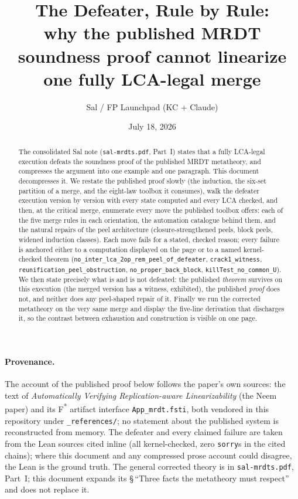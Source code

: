 \documentclass[11pt]{article}
\title{\bfseries The Defeater, Rule by Rule:\\
\large why the published MRDT soundness proof cannot linearize one
fully LCA-legal merge}
\author{Sal / FP Launchpad (KC + Claude)}
\date{July 18, 2026}
\newcommand{\lean}[1]{\texttt{#1}}
\begin{document}
\maketitle
\sloppy

\begin{abstract}
\noindent
The consolidated Sal note (\texttt{sal-mrdts.pdf}, Part~I) states that a
fully LCA-legal execution defeats the soundness proof of the published
MRDT metatheory, and compresses the argument into one example and one
paragraph. This document decompresses it. We restate the published
proof slowly (the induction, the six-set partition of a merge, and the
eight-law toolbox it consumes), walk the defeater execution version by
version with every state computed and every LCA checked, and then, at
the critical merge, enumerate every move the published toolbox offers:
each of the five merge rules in each orientation, the automation
catalogue behind them, and the natural repairs of the peel architecture
(closure-strengthened peels, block peels, widened induction classes).
Each move fails for a stated, checked reason; every failure is anchored
either to a computation displayed on the page or to a named
kernel-checked theorem
(\lean{no\_inter\_lca\_2op\_rem\_peel\_of\_defeater},
\lean{crack1\_witness}, \lean{reunification\_peel\_obstruction},
\lean{no\_proper\_back\_block}, \lean{killTest\_no\_common\_U}). We then
state precisely what is and is not defeated: the published
\emph{theorem} survives on this execution (the merged version has a
witness, exhibited), the published \emph{proof} does not, and neither
does any peel-shaped repair of it. Finally we run the corrected
metatheory on the very same merge and display the five-line derivation
that discharges it, so the contrast between exhaustion and construction
is visible on one page.
\end{abstract}

\tableofcontents

\paragraph*{Provenance.} The account of the published proof below
follows the paper's own sources: the text of \emph{Automatically
Verifying Replication-aware Linearizability} (the Neem paper) and its
F\textsuperscript{*} artifact interface \lean{App\_mrdt.fsti}, both
vendored in this repository under \lean{\_references/}; no statement
about the published system is reconstructed from memory. The defeater
and every claimed failure are taken from the Lean sources cited inline
(all kernel-checked, zero \lean{sorry}s in the cited chains); where this
document and any compressed prose account could disagree, the Lean is
the ground truth. The general corrected theory is in
\texttt{sal-mrdts.pdf}, Part~I; this document expands its
\S\,``Three facts the metatheory must respect'' and does not replace it.
\end{document}
